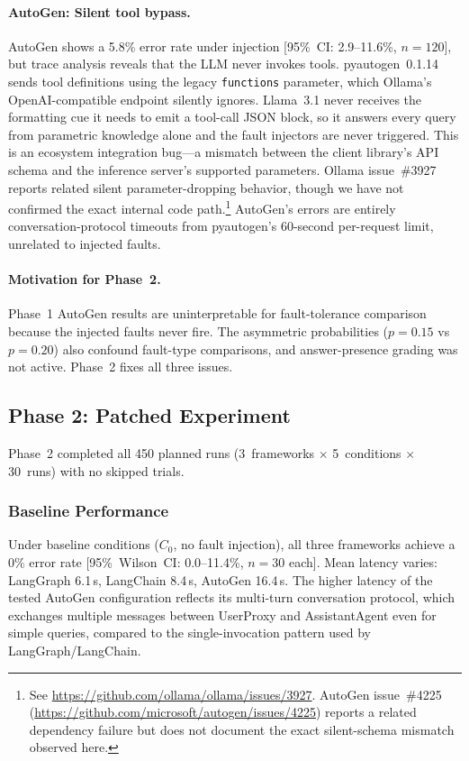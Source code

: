 \documentclass[make,article,submit,moreauthors,pdftex]{mdpi}
\newcommand{\Wrev}[1]{\texorpdfstring{{\color{RevisionOrange}#1}}{#1}}
\begin{document}
\paragraph{AutoGen: Silent tool bypass.} AutoGen shows a 5.8\% error rate under injection [95\%~CI: 2.9--11.6\%, $n = 120$], but trace analysis reveals that the LLM never invokes tools. pyautogen~0.1.14 sends tool definitions using the legacy \texttt{functions} parameter, which Ollama's OpenAI-compatible endpoint silently ignores. Llama~3.1 never receives the formatting cue it needs to emit a tool-call JSON block, so it answers every query from parametric knowledge alone and the fault injectors are never triggered. This is an ecosystem integration bug---a mismatch between the client library's API schema and the inference server's supported parameters. Ollama issue~\#3927 reports related silent parameter-dropping behavior, though we have not confirmed the exact internal code path.\footnote{See \url{https://github.com/ollama/ollama/issues/3927}. AutoGen issue~\#4225 (\url{https://github.com/microsoft/autogen/issues/4225}) reports a related dependency failure but does not document the exact silent-schema mismatch observed here.} AutoGen's errors are entirely conversation-protocol timeouts from pyautogen's 60-second per-request limit, unrelated to injected faults.

\paragraph{Motivation for Phase~2.} Phase~1 AutoGen results are uninterpretable for fault-tolerance comparison because the injected faults never fire. The asymmetric probabilities ($p = 0.15$ vs $p = 0.20$) also confound fault-type comparisons, and answer-presence grading was not active. Phase~2 fixes all three issues.


\subsection{Phase 2: Patched Experiment}\label{sec:phase2-results}

Phase~2 completed all 450 planned runs (3~frameworks $\times$ 5~conditions $\times$ 30~runs) with no skipped trials.

\subsubsection{Baseline Performance}

Under baseline conditions ($C_0$, no fault injection), all three frameworks achieve a 0\% error rate [95\%~Wilson~CI: 0.0--11.4\%, $n = 30$ each]. Mean latency varies: LangGraph 6.1\,s, LangChain 8.4\,s, AutoGen 16.4\,s. \Wrev{The higher latency of the tested AutoGen configuration} reflects its multi-turn conversation protocol, which exchanges multiple messages between UserProxy and AssistantAgent even for simple queries, compared to the single-invocation pattern used by LangGraph/LangChain.
\end{document}
